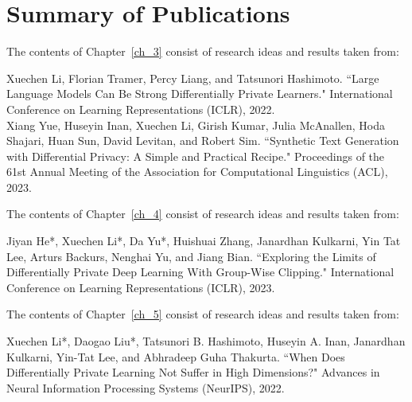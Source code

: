 
\newpage
\section{Summary of Publications}

\noindent The contents of Chapter~\ref{ch_3} consist of research ideas and results taken from:

\begin{mdframed}[leftline=true, topline=false, rightline=false, bottomline=false, linewidth=2pt]
Xuechen Li, Florian Tramer, Percy Liang, and Tatsunori Hashimoto. ``Large Language Models Can Be Strong Differentially Private Learners." International Conference on Learning Representations (ICLR), 2022.~\cite{li2022large}\\

\noindent Xiang Yue, Huseyin Inan, Xuechen Li, Girish Kumar, Julia McAnallen, Hoda Shajari, Huan Sun, David Levitan, and Robert Sim. ``Synthetic Text Generation with Differential Privacy: A Simple and Practical Recipe." Proceedings of the 61st Annual Meeting of the Association for Computational Linguistics (ACL), 2023.~\cite{yue-etal-2023-synthetic}
\end{mdframed}

\noindent The contents of Chapter~\ref{ch_4} consist of research ideas and results taken from:

\begin{mdframed}[leftline=true, topline=false, rightline=false, bottomline=false, linewidth=2pt]
Jiyan He*, Xuechen Li*, Da Yu*, Huishuai Zhang, Janardhan Kulkarni, Yin Tat Lee, Arturs Backurs, Nenghai Yu, and Jiang Bian. ``Exploring the Limits of Differentially Private Deep Learning With Group-Wise Clipping." International Conference on Learning Representations (ICLR), 2023.~\cite{he2022exploring}
\end{mdframed}

\noindent The contents of Chapter~\ref{ch_5} consist of research ideas and results taken from:

\begin{mdframed}[leftline=true, topline=false, rightline=false, bottomline=false, linewidth=2pt]
Xuechen Li*, Daogao Liu*, Tatsunori B. Hashimoto, Huseyin A. Inan, Janardhan Kulkarni, Yin-Tat Lee, and Abhradeep Guha Thakurta. ``When Does Differentially Private Learning Not Suffer in High Dimensions?" Advances in Neural Information Processing Systems (NeurIPS), 2022.~\cite{li2022does}
\end{mdframed}


